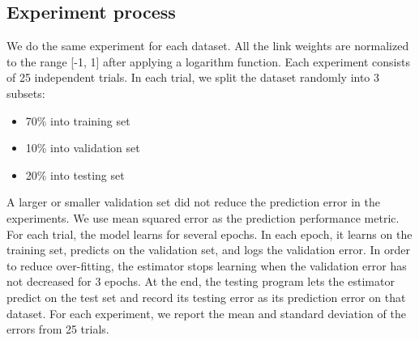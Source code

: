 \documentclass[12pt]{WSUThesis}
\theoremstyle{definition}
\begin{document}
\subsection{Experiment process}
We do the same experiment for each dataset.
All the link weights are normalized to the range [-1, 1] after applying a logarithm function.
Each experiment consists of 25 independent trials.
In each trial, we split the dataset randomly into 3 subsets:
\begin{itemize}
	\item 70\% into training set
	\item 10\% into validation set
	\item 20\% into testing set
\end{itemize}
A larger or smaller validation set did not reduce the prediction error in the 
experiments.
We use mean squared error as the prediction performance metric.
For each trial, the model learns for several epochs.
In each epoch,
it learns on the training set,
predicts on the validation set,
and logs the validation error.
In order to reduce over-fitting,
the estimator stops learning when the validation error has not decreased for 3 
epochs.
At the end, the testing program lets the estimator predict on the test set 
and record its testing error as its prediction error on that dataset.
For each experiment, we report the mean and standard deviation of the errors from 25 trials.
\end{document}
